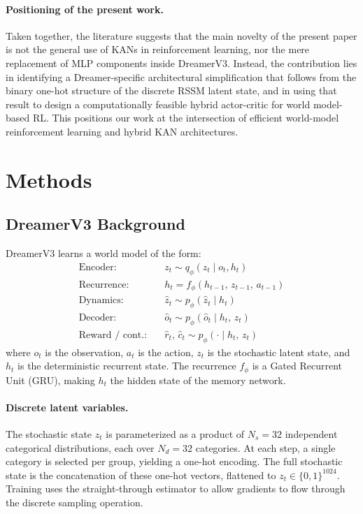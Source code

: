 \documentclass[11pt, a4paper]{article}
\begin{document}
\paragraph{Positioning of the present work.}
Taken together, the literature suggests that the main novelty of the present
paper is not the general use of KANs in reinforcement learning, nor the mere
replacement of MLP components inside DreamerV3. Instead, the contribution lies
in identifying a Dreamer-specific architectural simplification that follows
from the binary one-hot structure of the discrete RSSM latent state, and in
using that result to design a computationally feasible hybrid actor-critic for
world model-based RL. This positions our work at the intersection of efficient
world-model reinforcement learning and hybrid KAN architectures. 

\section{Methods}

\subsection{DreamerV3 Background}

DreamerV3 learns a world model of the form:
\begin{align}
  \text{Encoder:}       &\quad z_t \sim q_\phi(z_t \mid o_t, h_t) \\
  \text{Recurrence:}    &\quad h_t = f_\phi(h_{t-1},\, z_{t-1},\, a_{t-1}) \\
  \text{Dynamics:}      &\quad \hat{z}_t \sim p_\phi(\hat{z}_t \mid h_t) \\
  \text{Decoder:}       &\quad \hat{o}_t \sim p_\phi(\hat{o}_t \mid h_t,\, z_t) \\
  \text{Reward / cont.:}&\quad \hat{r}_t,\, \hat{c}_t \sim p_\phi(\cdot \mid h_t,\, z_t)
\end{align}
where $o_t$ is the observation, $a_t$ is the action, $z_t$ is the stochastic
latent state, and $h_t$ is the deterministic recurrent state. The recurrence
$f_\phi$ is a Gated Recurrent Unit (GRU), making $h_t$ the hidden state of the
memory network.

\paragraph{Discrete latent variables.}
The stochastic state $z_t$ is parameterized as a product of $N_s = 32$
independent categorical distributions, each over $N_d = 32$ categories. At
each step, a single category is selected per group, yielding a one-hot
encoding. The full stochastic state is the concatenation of these one-hot
vectors, flattened to $z_t \in \{0,1\}^{1024}$. Training uses the
straight-through estimator to allow gradients to flow through the discrete
sampling operation.
\end{document}
